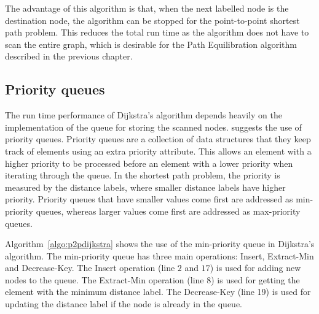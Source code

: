 The advantage of this algorithm is that,
when the next labelled node is the destination node,
the algorithm can be stopped for the point-to-point shortest path problem.
This reduces the total run time as the algorithm does not have to scan the entire graph,
which is desirable for the Path Equilibration algorithm described in the previous chapter.

\subsection{Priority queues} \label{sec:pq}
The run time performance of Dijkstra's algorithm depends heavily on the implementation of the queue for storing the scanned nodes.
\citet{Cormen} suggests the use of priority queues.
Priority queues are a collection of data structures
that they keep track of elements using an extra priority attribute.
This allows an element with a higher priority to be processed before an element with a lower priority when iterating through the queue.
In the shortest path problem, the priority is measured by the distance labels, where smaller distance labels have higher priority.
Priority queues that have smaller values come first are addressed as min-priority queues, whereas larger values come first are addressed as max-priority queues.

Algorithm~\ref{algo:p2pdijkstra} shows the use of the min-priority queue in Dijkstra's algorithm.
The min-priority queue has three main operations: Insert, Extract-Min and Decrease-Key.
The Insert operation (line $2$ and $17$) is used for adding new nodes to the queue.
The Extract-Min operation (line 8) is used for getting the element with the minimum distance label.
The Decrease-Key (line 19) is used for updating the distance label if the node is already in the queue.

